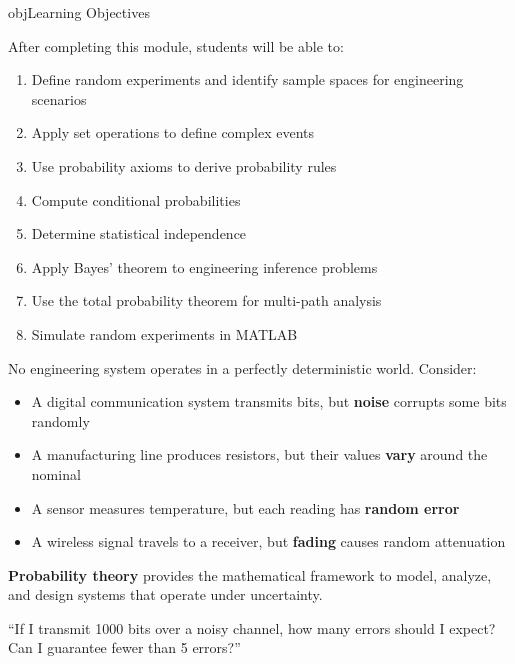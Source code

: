 \begin{PSbox}[unbreakable]{obj}{Learning Objectives}

After completing this module, students will be able to:

\begin{enumerate}
\def\labelenumi{\arabic{enumi}.}
\tightlist
\item
  Define random experiments and identify sample spaces for engineering scenarios
\item
  Apply set operations to define complex events
\item
  Use probability axioms to derive probability rules
\item
  Compute conditional probabilities
\item
  Determine statistical independence
\item
  Apply Bayes’ theorem to engineering inference problems
\item
  Use the total probability theorem for multi-path analysis
\item
  Simulate random experiments in MATLAB
\end{enumerate}

\end{PSbox}



No engineering system operates in a perfectly deterministic world. Consider:

\begin{itemize}
\tightlist
\item
  A digital communication system transmits bits, but \textbf{noise} corrupts some bits randomly
\item
  A manufacturing line produces resistors, but their values \textbf{vary} around the nominal
\item
  A sensor measures temperature, but each reading has \textbf{random error}
\item
  A wireless signal travels to a receiver, but \textbf{fading} causes random attenuation
\end{itemize}

\textbf{Probability theory} provides the mathematical framework to model, analyze, and design systems that operate under uncertainty.


\begin{PSquote}

``If I transmit 1000 bits over a noisy channel, how many errors should I expect? Can I guarantee fewer than 5 errors?''

\end{PSquote}

